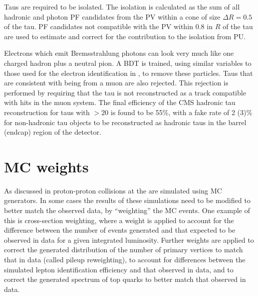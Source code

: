 Taus are required to be isolated. The isolation is calculated as the sum of all hadronic and photon \ac{PF} candidates from the \ac{PV} within a cone of size $\Delta R=0.5$ of the tau. \ac{PF} candidates not compatible with the \ac{PV} within 0.8 in $R$ of the tau are used to estimate and correct for the contribution to the isolation from \ac{PU}. 

Electrons which emit Bremsstrahlung photons can look very much like one charged hadron plus a neutral pion. A \ac{BDT} is trained, using similar variables to those used for the electron identification in , to remove these particles. Taus that are consistent with being from a muon are also rejected. This rejection is performed by requiring that the tau is not reconstructed as a track compatible with hits in the muon system. The final efficiency of the CMS hadronic tau reconstruction for taus with \pt$>20$ \GeV is found to be 55\%, with a fake rate of 2 (3)\% for non-hadronic tau objects to be reconstructed as hadronic taus in the barrel (endcap) region of the detector.

\section{MC weights}
\label{sec:mcweights}
As discussed in  proton-proton collisions at the \LHC are simulated using \ac{MC} generators. In some cases the results of these simulations need to be modified to better match the observed data, by ``weighting'' the \ac{MC} events. One example of this is cross-section weighting, where a weight is applied to account for the difference between the number of events generated and that expected to be observed in data for a given integrated luminosity. Further weights are applied to correct the generated distribution of the number of primary vertices to match that in data (called pileup reweighting), to account for differences between the simulated lepton identification efficiency and that observed in data, and to correct the generated \pt spectrum of top quarks to better match that observed in data.

